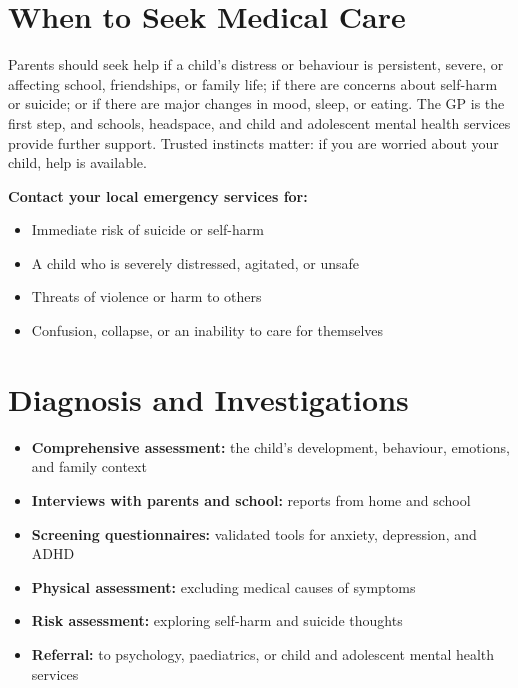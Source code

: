 \section*{When to Seek Medical Care}
Parents should seek help if a child's distress or behaviour is persistent, severe, or affecting school, friendships, or family life; if there are concerns about self-harm or suicide; or if there are major changes in mood, sleep, or eating. The GP is the first step, and schools, headspace, and child and adolescent mental health services provide further support. Trusted instincts matter: if you are worried about your child, help is available.

\textbf{Contact your local emergency services for:}
\begin{itemize}
    \item Immediate risk of suicide or self-harm
    \item A child who is severely distressed, agitated, or unsafe
    \item Threats of violence or harm to others
    \item Confusion, collapse, or an inability to care for themselves
\end{itemize}

\section*{Diagnosis and Investigations}
\begin{itemize}
    \item \textbf{Comprehensive assessment:} the child's development, behaviour, emotions, and family context
    \item \textbf{Interviews with parents and school:} reports from home and school
    \item \textbf{Screening questionnaires:} validated tools for anxiety, depression, and ADHD
    \item \textbf{Physical assessment:} excluding medical causes of symptoms
    \item \textbf{Risk assessment:} exploring self-harm and suicide thoughts
    \item \textbf{Referral:} to psychology, paediatrics, or child and adolescent mental health services
\end{itemize}

